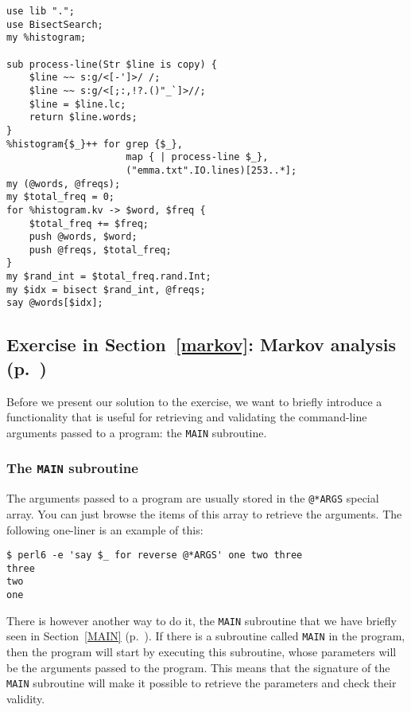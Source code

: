 \begin{verbatim}
use lib ".";
use BisectSearch;
my %histogram;

sub process-line(Str $line is copy) {
    $line ~~ s:g/<[-']>/ /; 
    $line ~~ s:g/<[;:,!?.()"_`]>//; 
    $line = $line.lc; 
    return $line.words;
}
%histogram{$_}++ for grep {$_},
                     map { | process-line $_}, 
                     ("emma.txt".IO.lines)[253..*]; 
my (@words, @freqs);
my $total_freq = 0;
for %histogram.kv -> $word, $freq {
    $total_freq += $freq;
    push @words, $word;
    push @freqs, $total_freq;
}
my $rand_int = $total_freq.rand.Int;
my $idx = bisect $rand_int, @freqs;
say @words[$idx];
\end{verbatim}

\subsection{Exercise in Section~\ref{markov}: Markov analysis (p.~\pageref{markov_analysis})}
\label{sol_markov_analysis}

Before we present our solution to the exercise, we want 
to briefly introduce a functionality that is useful for 
retrieving and validating the command-line arguments passed 
to a program: the {\tt MAIN} subroutine.

\subsubsection{The {\tt MAIN} subroutine}
\label{MAIN_sub}

The arguments passed to a program are usually stored in the 
\verb'@*ARGS' special array. You can just browse the items of this 
array to retrieve the arguments. The following one-liner is 
an example of this:

\begin{verbatim}
$ perl6 -e 'say $_ for reverse @*ARGS' one two three
three
two
one
\end{verbatim}

There is however another way to do it, the {\tt MAIN} 
subroutine that we have briefly seen in Section~\ref{MAIN} 
(p.~\pageref{MAIN}). If there is a subroutine 
called {\tt MAIN} in the program, then the program will start 
by executing this subroutine, whose parameters will be the 
arguments passed to the program. This means that the signature 
of the {\tt MAIN} subroutine will make it possible to retrieve the 
parameters and check their validity.

